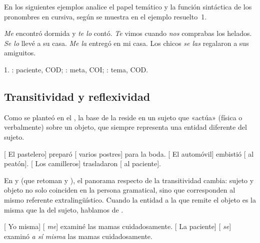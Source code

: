 \begin{ejercicio}\label{ej:10-papeles}
En los siguientes ejemplos analice el papel temático y la función sintáctica de
los pronombres en cursiva, según se muestra en el ejemplo resuelto~1.

\begin{exe}
  \ex \textit{Me} encontró dormida y \textit{te lo} contó.
  \ex \textit{Te} vimos cuando \textit{nos} comprabas los helados.
  \ex \textit{Se lo} llevé a su casa.
  \ex \textit{Me la} entregó en mi casa.
  \ex Los chicos \textit{se las} regalaron a sus amiguitos.
\end{exe}

\begin{resuelto}
1. : paciente, COD; : meta, COI; : tema, COD.
\end{resuelto}
\end{ejercicio}

\subsection{Transitividad y reflexividad}\label{sec:10-transitividad}

Como se planteó en el , la base de la  reside en
un sujeto que «actúa» (física o verbalmente) sobre un objeto, que siempre
representa una entidad diferente del sujeto.

\begin{exe}
  \ex {}[ El pastelero] preparó [ varios postres] para la
      boda.
  \ex {}[ El automóvil] embistió [ al peatón].
  \ex {}[ Los camilleros] trasladaron [ al paciente].
\end{exe}

En  y  (que retoman  y
), el panorama respecto de la transitividad cambia: sujeto
y objeto no solo coinciden en la persona gramatical, sino que corresponden al
mismo referente extralingüístico. Cuando la entidad a la que remite el objeto es
la misma que la del sujeto, hablamos de .

\begin{exe}
  \ex\label{ex:10-refl1} {}[ Yo misma] [
      \textit{me}] examiné las mamas cuidadosamente.
  \ex\label{ex:10-refl2} {}[ La paciente] [ \textit{se}] examinó \textit{a sí misma} las mamas cuidadosamente.
\end{exe}

